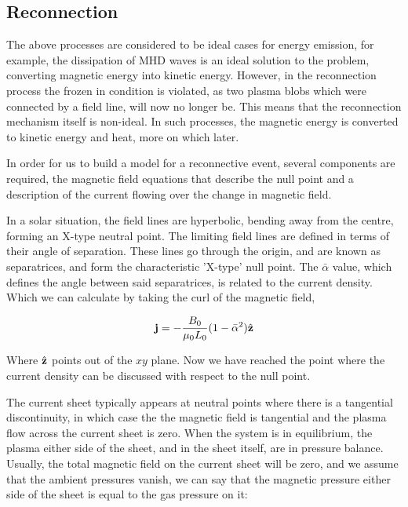 \subsection{Reconnection}
\label{sec:recon}

The above processes are considered to be ideal cases for energy emission, for example, the dissipation of MHD waves is an ideal solution to the problem, converting magnetic energy into kinetic energy.
However, in the reconnection process the frozen in condition is violated, as two plasma blobs which were connected by a field line, will now no longer be.
This means that the reconnection mechanism itself is non-ideal.
In such processes, the magnetic energy is converted to kinetic energy and heat, more on which later.

In order for us to build a model for a reconnective event, several components are required, the magnetic field equations that describe the null point and a description of the current flowing over the change in magnetic field.

In a solar situation, the field lines are hyperbolic, bending away from the centre, forming an X-type neutral point.
The limiting field lines are defined in terms of their angle of separation.
These lines go through the origin, and are known as separatrices, and form the characteristic 'X-type' null point. 
The $\bar{\alpha}$ value, which defines the angle between said separatrices, is related to the current density.
Which we can calculate by taking the curl of the magnetic field, \cite{Priest2007}

\begin{equation}
	\mathbf{j} = -\frac{B_0}{\mu_0L_0}(1 - \bar{\alpha}^2)\hat{\mathbf{z}}
\end{equation}

\noindent Where $\hat{\mathbf{z}}$ points out of the $xy$ plane.
Now we have reached the point where the current density can be discussed with respect to the null point.

The current sheet typically appears at neutral points where there is a tangential discontinuity, in which case the the magnetic field is tangential and the plasma flow across the current sheet is zero.
When the system is in equilibrium, the plasma either side of the sheet, and in the sheet itself, are in pressure balance.
Usually, the total magnetic field on the current sheet will be zero, and we assume that the ambient pressures vanish, we can say that the magnetic pressure either side of the sheet is equal to the gas pressure on it:

